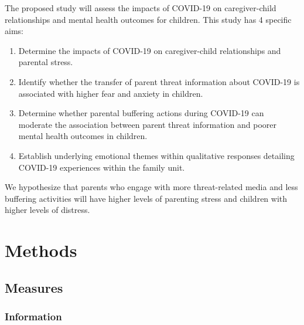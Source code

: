 \documentclass[]{book}
\providecommand{\tightlist}{%
  \setlength{\itemsep}{0pt}\setlength{\parskip}{0pt}}
\begin{document}
The proposed study will assess the impacts of COVID-19 on caregiver-child relationships and mental health outcomes for children. This study has 4 specific aims:

\begin{enumerate}
\def\labelenumi{(\arabic{enumi})}
\tightlist
\item
  Determine the impacts of COVID-19 on caregiver-child relationships and parental stress.
\item
  Identify whether the transfer of parent threat information about COVID-19 is associated with higher fear and anxiety in children.
\item
  Determine whether parental buffering actions during COVID-19 can moderate the association between parent threat information and poorer mental health outcomes in children.
\item
  Establish underlying emotional themes within qualitative responses detailing COVID-19 experiences within the family unit.
\end{enumerate}

We hypothesize that parents who engage with more threat-related media and less buffering activities will have higher levels of parenting stress and children with higher levels of distress.

\hypertarget{methods}{%
\chapter{Methods}\label{methods}}

\hypertarget{measures}{%
\section{Measures}\label{measures}}

\hypertarget{information}{%
\subsection{Information}\label{information}}
\end{document}
